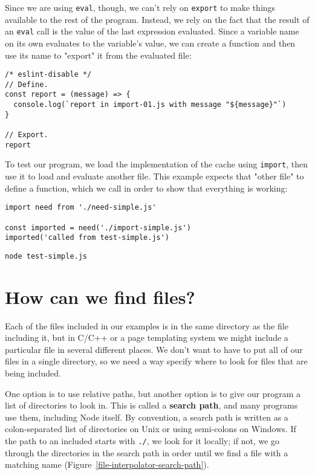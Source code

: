 \documentclass[krantzl]{krantz}
\newcommand{\figref}[1]{Figure~\ref{#1}}
\newcommand{\glossref}[1]{\textbf{#1}}
\begin{document}
Since we are using \texttt{eval}, though,
we can't rely on \texttt{export} to make things available to the rest of the program.
Instead,
we rely on the fact that the result of an \texttt{eval} call is the value of
the last expression evaluated.
Since a variable name on its own evaluates to the variable's value,
we can create a function and then use its name
to "export" it from the evaluated file:


\begin{lstlisting}[frame=single,frameround=tttt]
/* eslint-disable */
// Define.
const report = (message) => {
  console.log(`report in import-01.js with message "${message}"`)
}

// Export.
report
\end{lstlisting}



To test our program,
we load the implementation of the cache using \texttt{import},
then use it to load and evaluate another file.
This example expects that "other file" to define a function,
which we call in order to show that everything is working:


\begin{lstlisting}[frame=single,frameround=tttt]
import need from './need-simple.js'

const imported = need('./import-simple.js')
imported('called from test-simple.js')
\end{lstlisting}



\begin{lstlisting}[frame=single,frameround=tttt]
node test-simple.js
\end{lstlisting}


\section{How can we find files?}\label{file-interpolator-find}


Each of the files included in our examples is in the same directory as the file including it,
but in C/C++ or a page templating system
we might include a particular file in several different places.
We don't want to have to put all of our files in a single directory,
so we need a way specify where to look for files that are being included.


One option is to use relative paths,
but another option is to give our program
a list of directories to look in.
This is called a \glossref{search path},
and many programs use them,
including Node itself.
By convention,
a search path is written as a colon-separated list of directories on Unix
or using semi-colons on Windows.
If the path to an included starts with \texttt{./},
we look for it locally;
if not,
we go through the directories in the search path in order
until we find a file with a matching name
(\figref{file-interpolator-search-path}).
\end{document}
